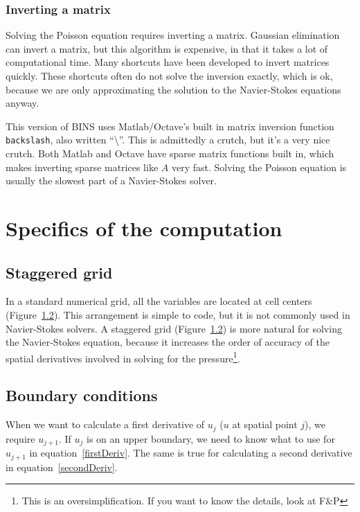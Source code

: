 \documentclass[12pt]{article}
\begin{document}
\subsubsection{Inverting a matrix}
Solving the Poisson equation requires inverting a matrix.  Gaussian elimination can invert a matrix, but this algorithm is expensive, in that it takes a lot of computational time.  Many shortcuts have been developed to invert matrices quickly.  These shortcuts often do not solve the inversion exactly, which is ok, because we are only approximating the solution to the Navier-Stokes equations anyway.

This version of BINS uses Matlab/Octave's built in matrix inversion function \texttt{backslash}, also written ``\textbackslash''.  This is admittedly a crutch, but it's a very nice crutch.  Both Matlab and Octave have sparse matrix functions built in, which makes inverting sparse matrices like $A$ very fast.  Solving the Poisson equation is usually the slowest part of a Navier-Stokes solver.

\section{Specifics of the computation}
\subsection{Staggered grid}
\label{staggeredGrid}
In a standard numerical grid, all the variables are located at cell centers (Figure~\ref{}).  This arrangement is simple to code, but it is not commonly used in Navier-Stokes solvers.  A staggered grid (Figure~\ref{}) is more natural for solving the Navier-Stokes equation, because it increases the order of accuracy of the spatial derivatives involved in solving for the pressure\footnote{This is an oversimplification.  If you want to know the details, look at F\&P}.

\subsection{Boundary conditions}
When we want to calculate a first derivative of $u_j$ ($u$ at spatial point $j$), we require $u_{j+1}$.  If $u_j$ is on an upper boundary, we need to know what to use for $u_{j+1}$ in equation~\ref{firstDeriv}.  The same is true for calculating a second derivative in equation~\ref{secondDeriv}.
\end{document}
